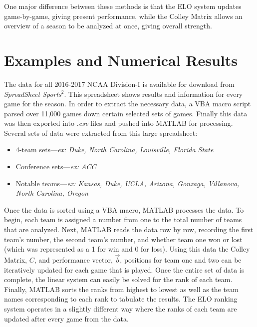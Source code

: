 \documentclass{article}
\begin{document}
One major difference between these methods is that the ELO system updates game-by-game, giving present performance, while the Colley Matrix allows an overview of a season to be analyzed at once, giving overall strength.
\section{Examples and Numerical Results}
The data for all 2016-2017 NCAA Division-I is available for download from \textit{SpreadSheet Sports}$^{2}$. This spreadsheet shows results and information for every game for the season. In order to extract the necessary data, a VBA macro script parsed over 11,000 games down certain selected sets of games. Finally this data was then exported into \textit{.csv} files and pushed into MATLAB for processing. Several sets of data were extracted from this large spreadsheet:
\begin{itemize}
\item 4-team sets---\textit{ex: Duke, North Carolina, Louisville, Florida State}
\item Conference sets---\textit{ex: ACC}
\item Notable teams---\textit{ex: Kansas, Duke, UCLA, Arizona, Gonzaga, Villanova, North Carolina, Oregon}
\end{itemize}

Once the data is sorted using a VBA macro, MATLAB processes the data. To begin, each team is assigned a number from one to the total number of teams that are analyzed. Next, MATLAB reads the data row by row, recording the first team's number, the second team's number, and whether team one won or lost (which was represented as a 1 for win and 0 for loss). Using this data the Colley Matrix, $C$, and performance vector, $\vec{b}$, positions for team one and two can be iteratively updated for each game that is played. Once the entire set of data is complete, the linear system can easily be solved for the rank of each team. Finally, MATLAB sorts the ranks from highest to lowest as well as the team names corresponding to each rank to tabulate the results. The ELO ranking system operates in a slightly different way where the ranks of each team are updated after every game from the data.
\end{document}
